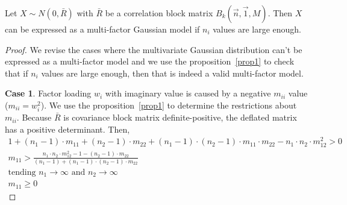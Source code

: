 \documentclass[11pt,fleqn]{book} %
\begin{document}
\begin{proposition}
	\label{prop:gmfamgb}
	Let $X \sim N(0,\bar{R})$ with $\bar{R}$ be a correlation block matrix 
	$B_k(\vec{n},\vec{1},M)$. Then $X$ can be expressed as a multi-factor 
	Gaussian model if $n_i$ values are large enough.
\end{proposition}
\begin{proof}
	We revise the cases where the multivariate Gaussian distribution can't
	be expressed as a multi-factor model and we use the proposition~\ref{prop1}
	to check that if $n_i$ values are large enough, then 
	that is indeed a valid multi-factor model.
	
	\textbf{Case 1}. Factor loading $w_i$ with imaginary value is caused by 
	a negative $m_{ii}$ value ($m_{ii} = w_i^2$). We use the 
	proposition~\ref{prop1} to determine the restrictions about $m_{ii}$. 
	Because $\bar{R}$ is covariance block matrix definite-positive, the 
	deflated matrix has a positive determinant. Then,
	\begin{displaymath}
		\begin{array}{l}
			1 + (n_1-1) \cdot m_{11} + (n_2-1) \cdot m_{22} +                     
			(n_1-1) \cdot (n_2-1) \cdot m_{11} \cdot m_{22} -                     
			n_1 \cdot n_2 \cdot m_{12}^2 > 0                                      
			                                                                      \\
			m_{11} > \frac{n_1 \cdot n_2 \cdot m_{12}^2 -1 -(n_2-1) \cdot m_{22}} 
			{(n_1-1) + (n_1-1) \cdot (n_2-1) \cdot m_{22}}                        
			                                                                      \\
			\text{tending } n_1 \to \infty \text{ and } n_2 \to \infty
			                                                                      \\
			m_{11} \ge 0                                                          
		\end{array}
	\end{displaymath}
	

\end{proof}
\end{document}
